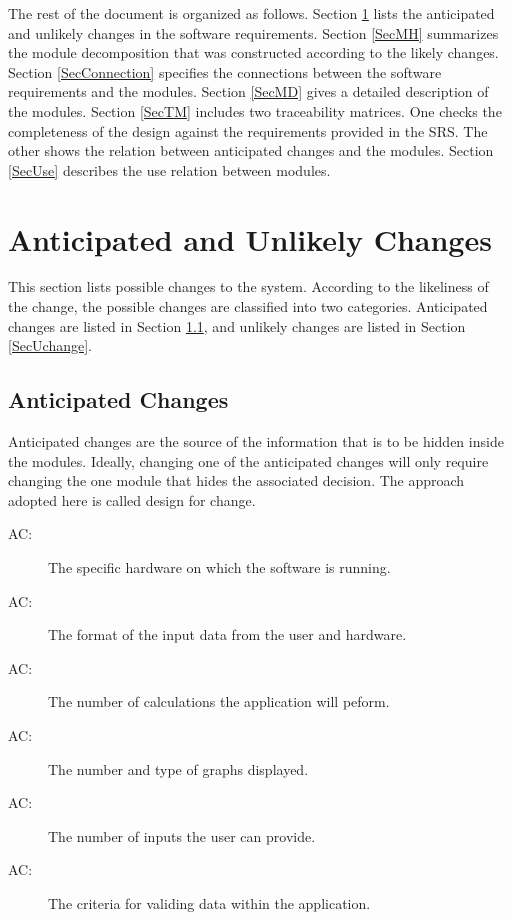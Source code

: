 \documentclass[12pt, titlepage]{article}
\newcounter{acnum}
\newcommand{\actheacnum}{AC\theacnum}
\begin{document}
The rest of the document is organized as follows. Section
\ref{SecChange} lists the anticipated and unlikely changes in the software
requirements. Section \ref{SecMH} summarizes the module decomposition that
was constructed according to the likely changes. Section \ref{SecConnection}
specifies the connections between the software requirements and the
modules. Section \ref{SecMD} gives a detailed description of the
modules. Section \ref{SecTM} includes two traceability matrices. One checks
the completeness of the design against the requirements provided in the SRS. The
other shows the relation between anticipated changes and the modules. Section
\ref{SecUse} describes the use relation between modules.

\section{Anticipated and Unlikely Changes} \label{SecChange}

This section lists possible changes to the system. According to the likeliness
of the change, the possible changes are classified into two
categories. Anticipated changes are listed in Section \ref{SecAchange}, and
unlikely changes are listed in Section \ref{SecUchange}.

\subsection{Anticipated Changes} \label{SecAchange}

Anticipated changes are the source of the information that is to be hidden
inside the modules. Ideally, changing one of the anticipated changes will only
require changing the one module that hides the associated decision. The approach
adopted here is called design for
change.

\begin{description}
\item[ \actheacnum \label{acHardware}:] The specific
  hardware on which the software is running.
\item[ \actheacnum \label{acInput}:] The format of the
  input data from the user and hardware.
\item[ \actheacnum \label{acCalculation}:] The number of calculations the application will peform.
\item[ \actheacnum \label{acGraph}:] The number and type of graphs displayed.
\item[ \actheacnum \label{acNumInput}:] The number of inputs the user can provide.
\item[ \actheacnum \label{acValidation}:] The criteria for validing data within the application.
\end{description}
\end{document}
